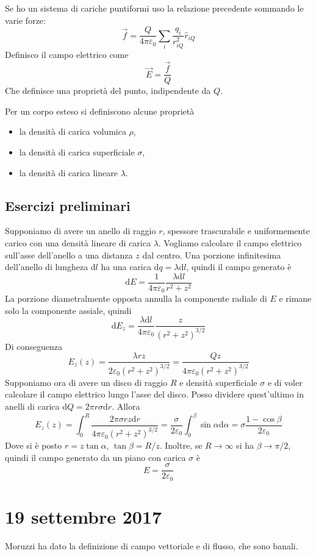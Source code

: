 \documentclass[a4paper,11pt]{book}
\let\oldepsilon\epsilon
\let\oldvarepsilon\varepsilon
\renewcommand{\epsilon}{\oldvarepsilon}
\renewcommand{\varepsilon}{\oldepsilon}
\theoremstyle{definition}
\theoremstyle{theorem}
\begin{document}
		Se ho un sistema di cariche puntiformi uso la relazione precedente sommando le varie forze:
		\[\vec{f}=\frac{Q}{4\pi\epsilon_0}\sum_{i}\frac{q_i}{r_{iQ}^2}\hat{r}_{iQ}\]
		Definisco il campo elettrico come
		\[\vec{E}=\frac{\vec{f}}{Q}\]
		Che definisce una proprietà del punto, indipendente da $Q$.
		
		Per un corpo esteso si definiscono alcune proprietà
		\begin{itemize}
			\item la densità di carica volumica $\rho$,
			\item la densità di carica superficiale $\sigma$,
			\item la densità di carica lineare $\lambda$.
		\end{itemize}
		\subsection{Esercizi preliminari}
		Supponiamo di avere un anello di raggio $r$, spessore trascurabile e uniformemente carico con una densità lineare di carica $\lambda$. Vogliamo calcolare il campo elettrico sull'asse dell'anello a una distanza $z$ dal centro. Una porzione infinitesima dell'anello di lungheza $\mathrm{d}l$ ha una carica $\mathrm{d}q=\lambda\mathrm{d}l$, quindi il campo generato è
		\[\mathrm{d}E=\frac{1}{4\pi\epsilon_0}\frac{\lambda\mathrm{d}l}{r^2+z^2}\]
		La porzione diametralmente opposta annulla la componente radiale di $E$ e rimane solo la componente assiale, quindi
		\[\mathrm{d}E_z=\frac{\lambda\mathrm{d}l}{4\pi\epsilon_0}\frac{z}{\left(r^2+z^2\right)^{3/2}}\]
		Di conseguenza
		\[E_z(z)=\frac{\lambda rz}{2\epsilon_0\left(r^2+z^2\right)^{3/2}}=\frac{Qz}{4\pi\epsilon_0\left(r^2+z^2\right)^{3/2}}\]
		Supponiamo ora di avere un disco di raggio $R$ e densità superficiale $\sigma$ e di voler calcolare il campo elettrico lungo l'asse del disco. Posso dividere quest'ultimo in anelli di carica $\mathrm{d}Q=2\pi r\sigma\mathrm{d}r$.
		Allora
		\[E_z(z)=\int_{0}^{R}\frac{2\pi \sigma rz\mathrm{d}r}{4\pi\epsilon_0\left(r^2+z^2\right)^{3/2}}=\frac{\sigma}{2\epsilon_0}\int_{0}^{\beta}\sin\alpha\mathrm{d}\alpha=\sigma\frac{1-\cos\beta}{2\epsilon_0}\]
		Dove si è posto $r=z\tan\alpha$, $\tan\beta=R/z$. Inoltre, se $R\to\infty$ si ha $\beta\to\pi/2$, quindi il campo generato da un piano con carica $\sigma$ è
		\[E=\frac{\sigma}{2\epsilon_0}\]
	\section{19 settembre 2017}
		Moruzzi ha dato la definizione di campo vettoriale e di flusso, che sono banali.
\end{document}
